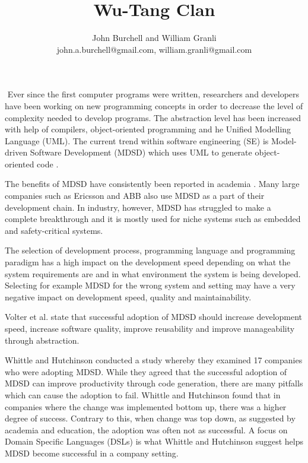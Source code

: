 \documentclass[10pt,twocolumn]{article}
\begin{document}
\title{Wu-Tang Clan}

\author{John Burchell and William Granli \\
john.a.burchell@gmail.com, william.granli@gmail.com}


\maketitle
\thispagestyle{empty}




​
Ever since the first computer programs were written, researchers and developers have been working on new programming concepts in order to decrease the level of complexity needed to develop programs. The abstraction level has been increased with help of compilers, object-oriented programming and he Unified Modelling Language (UML). The current trend within software engineering (SE) is Model-driven Software Development (MDSD) which uses UML to generate object-oriented code \cite{staron2006adopting}. 

The benefits of MDSD have consistently been reported in academia \cite{staron2006adopting} \cite{volter2013model}. Many large companies such as Ericsson and ABB \cite{staron2006adopting} also use MDSD as a part of their development chain. In industry, however, MDSD has struggled to make a complete breakthrough and it is mostly used for niche systems such as embedded and safety-critical systems.


The selection of development process, programming language and programming paradigm has a high impact on the development speed depending on what the system requirements are and in what environment the system is being developed. Selecting for example MDSD for the wrong system and setting may have a very negative impact on development speed, quality and maintainability. 


Volter et al. \cite{volter2013model} state that successful adoption of MDSD should increase development speed, increase software quality, improve reusability and improve manageability through abstraction.

Whittle and Hutchinson \cite{whittle2012mismatches} conducted a study whereby they examined 17 companies who were adopting MDSD. While they agreed that the successful adoption of MDSD can improve productivity through code generation, there are many pitfalls which can cause the adoption to fail. Whittle and Hutchinson found that in companies where the change was implemented bottom up, there was a higher degree of success. Contrary to this, when change was top down, as suggested by academia and education, the adoption was often not as successful. A focus on Domain Specific Languages (DSLs) is what Whittle and Hutchinson suggest helps MDSD become successful in a company setting.
\end{document}

